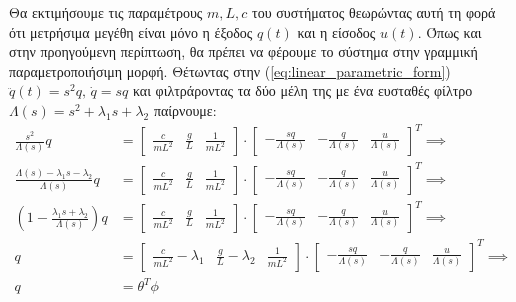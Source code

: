 \documentclass[a4paper,12pt]{article}
\begin{document}
Θα εκτιμήσουμε τις παραμέτρους $m, L, c$ του συστήματος θεωρώντας αυτή τη φορά ότι μετρήσιμα μεγέθη είναι μόνο η έξοδος
$q(t)$ και η είσοδος $u(t)$. Όπως και στην προηγούμενη περίπτωση, θα πρέπει να φέρουμε το σύστημα στην γραμμική 
παραμετροποιήσιμη μορφή. Θέτωντας στην (\ref{eq:linear_parametric_form}) $\ddot{q}(t) = s^2q, \, \dot{q}=sq$ και 
φιλτράροντας τα δύο μέλη της με ένα ευσταθές φίλτρο $\Lambda(s)  =s^2 + \lambda_1 s + \lambda_2$ παίρνουμε:
\begin{equation}
\begin{aligned}
    \frac{s^2}{\Lambda(s)}q &=
    \left[
    \begin{matrix}
        \frac{c}{mL^2} & \frac{g}{L} & \frac{1}{mL^2}
    \end{matrix}
    \right]
    \cdot
    \left[
    \begin{matrix}
        -\frac{sq}{\Lambda(s)} & -\frac{q}{\Lambda(s)} & \frac{u}{\Lambda(s)}
    \end{matrix}
    \right]^T 
    \implies \\
    \frac{\Lambda(s) - \lambda_1s-\lambda_2}{\Lambda(s)}q &=
    \left[
    \begin{matrix}
        \frac{c}{mL^2} & \frac{g}{L} & \frac{1}{mL^2}
    \end{matrix}
    \right]
    \cdot
    \left[
    \begin{matrix}
        -\frac{sq}{\Lambda(s)} & -\frac{q}{\Lambda(s)} & \frac{u}{\Lambda(s)}
    \end{matrix}
    \right]^T
    \implies \\
    \left(1 - \frac{\lambda_1s + \lambda_2}{\Lambda(s)}\right)q &=
    \left[
    \begin{matrix}
        \frac{c}{mL^2} & \frac{g}{L} & \frac{1}{mL^2}
    \end{matrix}
    \right]
    \cdot
    \left[
    \begin{matrix}
        -\frac{sq}{\Lambda(s)} & -\frac{q}{\Lambda(s)} & \frac{u}{\Lambda(s)}
    \end{matrix}
    \right]^T
    \implies \\
    q &=
    \left[
    \begin{matrix}
        \frac{c}{mL^2}-\lambda_1 & \frac{g}{L}-\lambda_2 & \frac{1}{mL^2}
    \end{matrix}
    \right]
    \cdot
    \left[
    \begin{matrix}
        -\frac{sq}{\Lambda(s)} & -\frac{q}{\Lambda(s)} & \frac{u}{\Lambda(s)}
    \end{matrix}
    \right]^T
    \implies \\
    q &= \theta^T \phi
    \label{eq:linear_parametric_form3}   
\end{aligned}
\end{equation}
\end{document}
